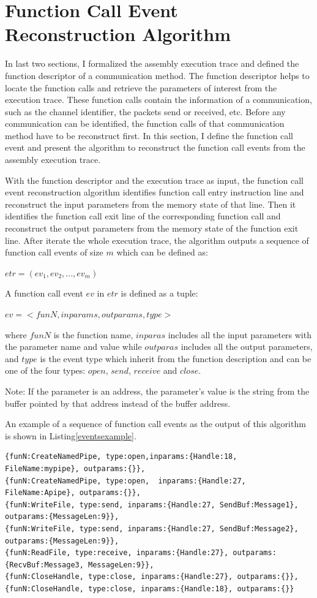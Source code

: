 \section{Function Call Event Reconstruction Algorithm}
In last two sections, I formalized the assembly execution trace and defined the function descriptor of a communication method. The function descriptor helps to locate the function calls and retrieve the parameters of interest from the execution trace. These function calls contain the information of a communication, such as the channel identifier, the packets send or received, etc. Before any communication can be identified, the function calls of that communication method have to be reconstruct first. In this section, I define the function call event and present the algorithm to reconstruct the function call events from the assembly execution trace. 

With the function descriptor and the execution trace as input, the function call event reconstruction algorithm identifies function call entry instruction line and reconstruct the input parameters from the memory state of that line. Then it identifies the function call exit line of the corresponding function call and reconstruct the output parameters from the memory state of the function exit line. After iterate the whole execution trace, the algorithm outputs a sequence of function call events of size $m$ which can be defined as:

$etr = (ev_1, ev_2, ..., ev_m)$

A function call event $ev$ in $etr$ is defined as a tuple:

$ev = <funN, inparams, outparams, type>$

where $funN$ is the function name, $inparas$ includes all the input parameters with the parameter name and value while $outparas$ includes all the output parameters, and $type$ is the event type which inherit from the function description and can be one of the four types: $open$, $send$, $receive$ and $close$.

Note: If the parameter is an address, the parameter's value is the string from the buffer pointed by that address instead of the buffer address.

An example of a sequence of function call events as the output of this algorithm is shown in Listing\ref{eventsexample}.

\begin{lstlisting}[caption= Example of  $etr$, label=eventsexample]
{funN:CreateNamedPipe, type:open,inparams:{Handle:18, FileName:mypipe}, outparams:{}},
{funN:CreateNamedPipe, type:open,  inparams:{Handle:27,  FileName:Apipe}, outparams:{}},
{funN:WriteFile, type:send, inparams:{Handle:27, SendBuf:Message1}, outparams:{MessageLen:9}},
{funN:WriteFile, type:send, inparams:{Handle:27, SendBuf:Message2}, outparams:{MessageLen:9}},
{funN:ReadFile, type:receive, inparams:{Handle:27}, outparams:{RecvBuf:Message3, MessageLen:9}},
{funN:CloseHandle, type:close, inparams:{Handle:27}, outparams:{}},
{funN:CloseHandle, type:close, inparams:{Handle:18}, outparams:{}}
\end{lstlisting}

